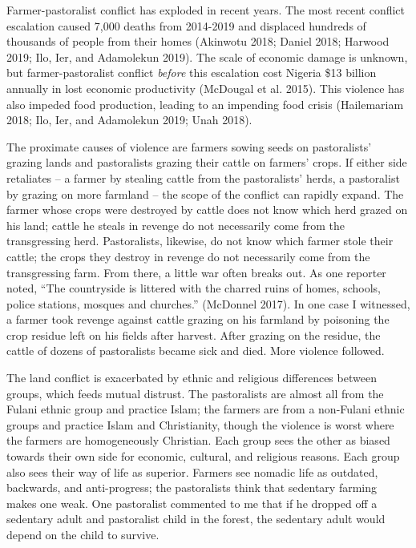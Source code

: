 \documentclass[11pt]{article}
\begin{document}
Farmer-pastoralist conflict has exploded in recent years. The most
recent conflict escalation caused 7,000 deaths from 2014-2019 and
displaced hundreds of thousands of people from their homes (Akinwotu
2018; Daniel 2018; Harwood 2019; Ilo, Ier, and Adamolekun 2019). The
scale of economic damage is unknown, but farmer-pastoralist conflict
\emph{before} this escalation cost Nigeria \$13 billion annually in lost
economic productivity (McDougal et al. 2015). This violence has also
impeded food production, leading to an impending food crisis
(Hailemariam 2018; Ilo, Ier, and Adamolekun 2019; Unah 2018).

The proximate causes of violence are farmers sowing seeds on
pastoralists' grazing lands and pastoralists grazing their cattle on
farmers' crops. If either side retaliates -- a farmer by stealing cattle
from the pastoralists' herds, a pastoralist by grazing on more farmland
-- the scope of the conflict can rapidly expand. The farmer whose crops
were destroyed by cattle does not know which herd grazed on his land;
cattle he steals in revenge do not necessarily come from the
transgressing herd. Pastoralists, likewise, do not know which farmer
stole their cattle; the crops they destroy in revenge do not necessarily
come from the transgressing farm. From there, a little war often breaks
out. As one reporter noted, ``The countryside is littered with the
charred ruins of homes, schools, police stations, mosques and
churches.'' (McDonnel 2017). In one case I witnessed, a farmer took
revenge against cattle grazing on his farmland by poisoning the crop
residue left on his fields after harvest. After grazing on the residue,
the cattle of dozens of pastoralists became sick and died. More violence
followed.

The land conflict is exacerbated by ethnic and religious differences
between groups, which feeds mutual distrust. The pastoralists are almost
all from the Fulani ethnic group and practice Islam; the farmers are
from a non-Fulani ethnic groups and practice Islam and Christianity,
though the violence is worst where the farmers are homogeneously
Christian. Each group sees the other as biased towards their own side
for economic, cultural, and religious reasons. Each group also sees
their way of life as superior. Farmers see nomadic life as outdated,
backwards, and anti-progress; the pastoralists think that sedentary
farming makes one weak. One pastoralist commented to me that if he
dropped off a sedentary adult and pastoralist child in the forest, the
sedentary adult would depend on the child to survive.
\end{document}
